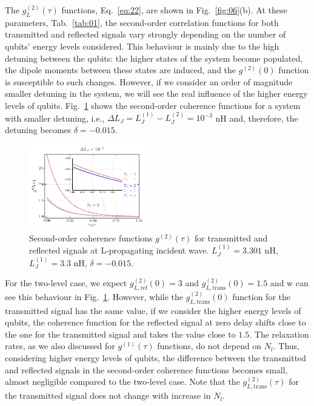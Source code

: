 \documentclass[lettersize,journal]{IEEEtran}
\begin{document}
The $g^{(2)}_L(\tau)$ functions, Eq.~\ref{eq:22}, are shown in Fig.~\ref{fig:06}(b).
At these parameters, Tab.~\ref{tab:01}, the second-order correlation functions for both transmitted and reflected signals vary strongly depending on the number of qubits' energy levels considered.
This behaviour is mainly due to the high detuning between the qubits: the higher states of the system become populated, the dipole moments between these states are induced, and the $g^{(2)}(0)$ function is susceptible to such changes.
However, if we consider an order of magnitude smaller detuning in the system, we will see the real influence of the higher energy levels of qubits.
Fig.~\ref{fig:06_1} shows the second-order coherence functions for a system with smaller detuning, i.e., $\Delta L_J = L_J^{(1)} - L_J^{(2)} = 10^{-3}$ nH and, therefore, the detuning becomes $\delta = -0.015$.
\begin{figure}[h]
    \centering
    \includegraphics[width=0.45\textwidth]{fig_4_1}
    \caption{Second-order coherence functions $g^{(2)}(\tau)$ for transmitted and reflected signals at L-propagating incident wave. $L_J^{(1)} = 3.301$ nH, $L_J^{(1)} = 3.3$ nH, $\delta = -0.015$.}
    \label{fig:06_1}
\end{figure}
For the two-level case, we expect $g^{(2)}_{L, \mathrm{ref}}(0) = 3$ and $g^{(2)}_{L, \mathrm{trans}}(0) = 1.5$ and w can see this behaviour in Fig.~\ref{fig:06_1}.
However, while the $g^{(2)}_{L, \mathrm{trans}}(0)$ function for the transmitted signal has the same value, if we consider the higher energy levels of qubits, the coherence function for the reflected signal at zero delay shifts close to the one for the transmitted signal and takes the value close to $1.5$.
The relaxation rates, as we also discussed for $g^{(1)}(\tau)$ functions, do not depend on $N_l$.
Thus, considering higher energy levels of qubits, the difference between the transmitted and reflected signals in the second-order coherence functions becomes small, almost negligible compared to the two-level case.
Note that the $g^{(2)}_{L, \mathrm{trans}}(\tau)$ for the transmitted signal does not change with increase in $N_l$.
\end{document}
